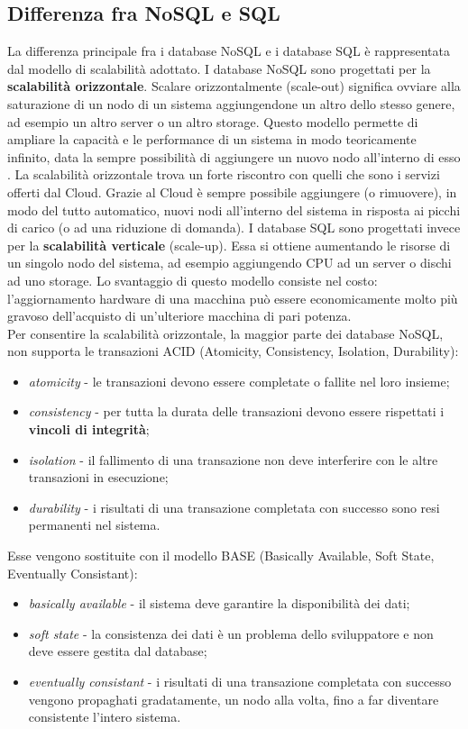 \subsection{Differenza fra NoSQL e SQL}
La differenza principale fra i database NoSQL e i database SQL è rappresentata dal modello di scalabilità adottato. I database NoSQL sono progettati per la \textbf{scalabilità orizzontale}. Scalare orizzontalmente (scale-out) significa ovviare alla saturazione di un nodo di un sistema aggiungendone un altro dello stesso genere, ad esempio un altro server o un altro storage. Questo modello permette di ampliare la capacità e le performance di un sistema in modo teoricamente infinito, data la sempre possibilità di aggiungere un nuovo nodo all'interno di esso \cite{wisefrogs}. La scalabilità orizzontale trova un forte riscontro con quelli che sono i servizi offerti dal Cloud. Grazie al Cloud è sempre possibile aggiungere (o rimuovere), in modo del tutto automatico, nuovi nodi all'interno del sistema in risposta ai picchi di carico (o ad una riduzione di domanda). I database SQL sono progettati invece per la \textbf{scalabilità verticale} (scale-up). Essa si ottiene aumentando le risorse di un singolo nodo del sistema, ad esempio aggiungendo CPU ad un server o dischi ad uno storage. Lo svantaggio di questo modello consiste nel costo: l'aggiornamento hardware di una macchina può essere economicamente molto più gravoso dell'acquisto di un'ulteriore macchina di pari potenza. \\
Per consentire la scalabilità orizzontale, la maggior parte dei database NoSQL, non supporta le transazioni ACID (Atomicity, Consistency, Isolation, Durability):
\begin{itemize}
    \item \textit{atomicity} - le transazioni devono essere completate o fallite nel loro insieme;
    \item \textit{consistency} - per tutta la durata delle transazioni devono essere rispettati i \textbf{vincoli di integrità};
    \item \textit{isolation} - il fallimento di una transazione non deve interferire con le altre transazioni in esecuzione;
    \item \textit{durability} - i risultati di una transazione completata con successo sono resi permanenti nel sistema.
\end{itemize}
Esse vengono sostituite con il modello BASE (Basically Available, Soft State, Eventually Consistant):
\begin{itemize}
    \item \textit{basically available} - il sistema deve garantire la disponibilità dei dati;
    \item \textit{soft state} - la consistenza dei dati è un problema dello sviluppatore e non deve essere gestita dal database;
    \item \textit{eventually consistant} - i risultati di una transazione completata con successo vengono propaghati gradatamente, un nodo alla volta, fino a far diventare consistente l'intero sistema.
\end{itemize}
